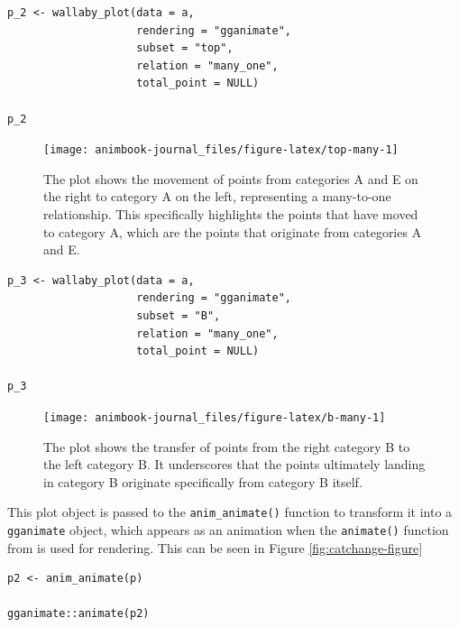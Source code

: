 \begin{verbatim}
p_2 <- wallaby_plot(data = a,
                    rendering = "gganimate",
                    subset = "top",
                    relation = "many_one",
                    total_point = NULL)

p_2
\end{verbatim}

\begin{figure}

{\centering \texttt{[image: animbook-journal\_files/figure-latex/top-many-1]} 

}

\caption{The plot shows the movement of points from categories A and E on the right to category A on the left, representing a many-to-one relationship. This specifically highlights the points that have moved to category A, which are the points that originate from categories A and E.}\label{fig:top-many}
\end{figure}

\begin{verbatim}
p_3 <- wallaby_plot(data = a,
                    rendering = "gganimate",
                    subset = "B",
                    relation = "many_one",
                    total_point = NULL)

p_3
\end{verbatim}

\begin{figure}

{\centering \texttt{[image: animbook-journal\_files/figure-latex/b-many-1]} 

}

\caption{The plot shows the transfer of points from the right category B to the left category B. It underscores that the points ultimately landing in category B originate specifically from category B itself.}\label{fig:b-many}
\end{figure}

This plot object is passed to the \texttt{anim\_animate()} function to transform it into a \texttt{gganimate} object, which appears as an animation when the \texttt{animate()} function from  is used for rendering. This can be seen in Figure \ref{fig:catchange-figure}

\begin{verbatim}
p2 <- anim_animate(p)

gganimate::animate(p2)
\end{verbatim}

